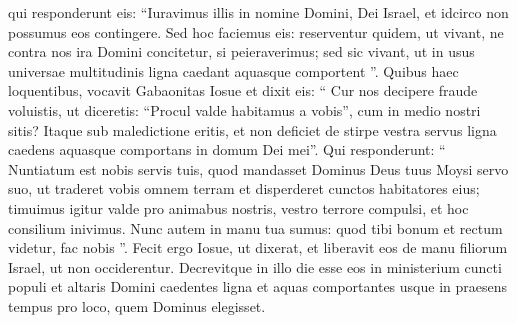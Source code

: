 \begin{biblechapter}
\begin{biblechapter}
\begin{biblechapter}
\begin{biblechapter}
\begin{biblechapter}
\begin{biblechapter}
\begin{biblechapter}
\begin{biblechapter}
\begin{biblechapter}
\verse qui responderunt eis: “Iuravimus illis in nomine Domini, Dei Israel, et idcirco non possumus eos contingere. 
\verse Sed hoc faciemus eis: reserventur quidem, ut vivant, ne contra nos ira Domini concitetur, si peieraverimus; 
\verse sed sic vivant, ut in usus universae multitudinis ligna caedant aquasque comportent ”.
 Quibus haec loquentibus, 
\verse vocavit Gabaonitas Iosue et dixit eis: “ Cur nos decipere fraude voluistis, ut diceretis: “Procul valde habitamus a vobis”, cum in medio nostri sitis? 
\verse Itaque sub maledictione eritis, et non deficiet de stirpe vestra servus ligna caedens aquasque comportans in domum Dei mei”. 
\verse Qui responderunt: “ Nuntiatum est nobis servis tuis, quod mandasset Dominus Deus tuus Moysi servo suo, ut traderet vobis omnem terram et disperderet cunctos habitatores eius; timuimus igitur valde pro animabus nostris, vestro terrore compulsi, et hoc consilium inivimus. 
\verse Nunc autem in manu tua sumus: quod tibi bonum et rectum videtur, fac nobis ”. 
\verse Fecit ergo Iosue, ut dixerat, et liberavit eos de manu filiorum Israel, ut non occiderentur. 
\verse Decrevitque in illo die esse eos in ministerium cuncti populi et altaris Domini caedentes ligna et aquas comportantes usque in praesens tempus pro loco, quem Dominus elegisset.
 

\end{biblechapter}
\end{biblechapter}
\end{biblechapter}
\end{biblechapter}
\end{biblechapter}
\end{biblechapter}
\end{biblechapter}
\end{biblechapter}
\end{biblechapter}
